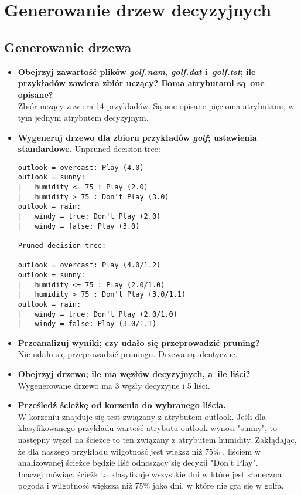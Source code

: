 \documentclass{article}
\begin{document}



\section{Generowanie drzew decyzyjnych}

\subsection{Generowanie drzewa}

\begin{itemize}
\item \textbf{Obejrzyj zawartość plików \emph{golf.nam}, \emph{golf.dat} i~\emph{golf.tst}; ile przykładów zawiera zbiór uczący? Iloma atrybutami są~one opisane?}
	\\Zbiór uczący zawiera 14 przykładów. Są one opisane pięcioma atrybutami, w tym jednym atrybutem decyzyjnym.

\item \textbf{Wygeneruj drzewo dla zbioru przykładów \emph{golf}; ustawienia standardowe.}
	 Unpruned decision tree:

\begin{verbatim}
outlook = overcast: Play (4.0)
outlook = sunny:
|   humidity <= 75 : Play (2.0)
|   humidity > 75 : Don't Play (3.0)
outlook = rain:
|   windy = true: Don't Play (2.0)
|   windy = false: Play (3.0)

Pruned decision tree:

outlook = overcast: Play (4.0/1.2)
outlook = sunny:
|   humidity <= 75 : Play (2.0/1.0)
|   humidity > 75 : Don't Play (3.0/1.1)
outlook = rain:
|   windy = true: Don't Play (2.0/1.0)
|   windy = false: Play (3.0/1.1)
\end{verbatim}



\item \textbf{Przeanalizuj wyniki; czy udało się przeprowadzić pruning?}
	\\Nie udało się przeprowadzić pruningu. Drzewa są identyczne.

\item \textbf{Obejrzyj drzewo; ile ma węzłów decyzyjnych, a~ile liści?}
	\\Wygenerowane drzewo ma 3 węzły decyzyjne i 5 liści.

\item \textbf{ Prześledź ścieżkę od korzenia do wybranego liścia.
}		\\W korzeniu znajduje się test związany z atrybutem outlook. Jeśli dla klasyfikowanego przykładu wartość atrybutu outlook wynosi "sunny", to następny węzeł na ścieżce to ten związany z atrybutem humidity. Zakłądając, że dla naszego przykładu wilgotność jest większ niż $ 75\% $ , liściem w analizowanej ścieżce będzie liść odnoszący się decyzji "Don't Play".
		\\Inaczej mówiąc, ścieżk ta klasyfikuje wszystkie dni w które jest słoneczna pogoda i wilgotność większa niż $ 75\% $ jako dni, w które nie gra się w golfa.
		

\end{itemize}
\end{document}
